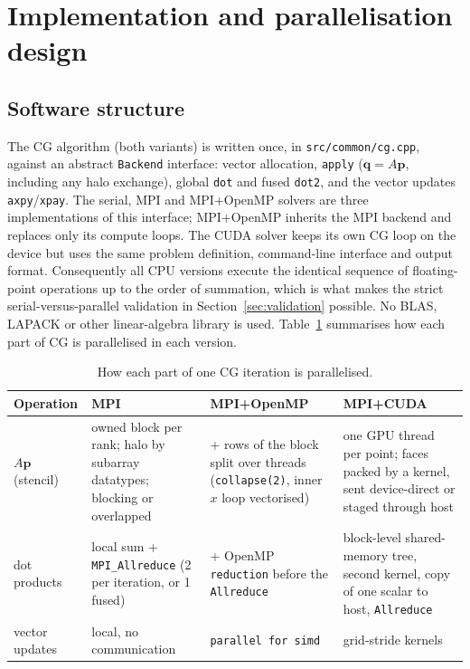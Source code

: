 \documentclass[11pt,a4paper]{article}
\begin{document}
\section{Implementation and parallelisation design}\label{sec:design}

\subsection{Software structure}
The CG algorithm (both variants) is written once, in \texttt{src/common/cg.cpp}, against an
abstract \texttt{Backend} interface: vector allocation, \texttt{apply} ($\mathbf q=A\mathbf p$,
including any halo exchange), global \texttt{dot} and fused \texttt{dot2}, and the vector updates
\texttt{axpy}/\texttt{xpay}. The serial, MPI and MPI+OpenMP solvers are three implementations of
this interface; MPI+OpenMP inherits the MPI backend and replaces only its compute loops. The CUDA
solver keeps its own CG loop on the device but uses the same problem definition, command-line
interface and output format. Consequently all CPU versions execute the identical sequence of
floating-point operations up to the order of summation, which is what makes the strict
serial-versus-parallel validation in Section~\ref{sec:validation} possible. No BLAS, LAPACK or other
linear-algebra library is used. Table~\ref{tab:techniques} summarises how each part of CG is
parallelised in each version.

\begin{table}[H]
\centering\small
\caption{How each part of one CG iteration is parallelised.}\label{tab:techniques}
\begin{tabularx}{\linewidth}{>{\raggedright\arraybackslash}p{2.7cm}>{\raggedright\arraybackslash}X>{\raggedright\arraybackslash}X>{\raggedright\arraybackslash}X}
\toprule
Operation & MPI & MPI+OpenMP & MPI+CUDA\\
\midrule
$A\mathbf p$ (stencil) & owned block per rank; halo by subarray datatypes; blocking or overlapped & + rows of the block split over threads (\texttt{collapse(2)}, inner $x$ loop vectorised) & one GPU thread per point; faces packed by a kernel, sent device-direct or staged through host\\
dot products & local sum + \texttt{MPI\_Allreduce} (2 per iteration, or 1 fused) & + OpenMP \texttt{reduction} before the \texttt{Allreduce} & block-level shared-memory tree, second kernel, copy of one scalar to host, \texttt{Allreduce}\\
vector updates & local, no communication & \texttt{parallel for simd} & grid-stride kernels\\
\bottomrule
\end{tabularx}
\end{table}
\end{document}
